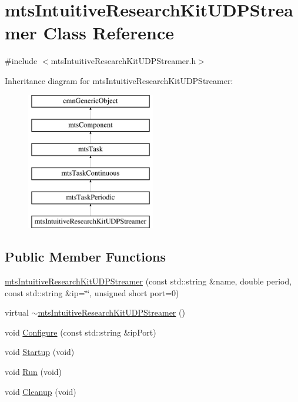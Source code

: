 \hypertarget{classmts_intuitive_research_kit_u_d_p_streamer}{}\section{mts\+Intuitive\+Research\+Kit\+U\+D\+P\+Streamer Class Reference}
\label{classmts_intuitive_research_kit_u_d_p_streamer}


{\ttfamily \#include $<$mts\+Intuitive\+Research\+Kit\+U\+D\+P\+Streamer.\+h$>$}

Inheritance diagram for mts\+Intuitive\+Research\+Kit\+U\+D\+P\+Streamer\+:\begin{figure}[H]
\begin{center}
\leavevmode
\includegraphics[height=6.000000cm]{dd/d92/classmts_intuitive_research_kit_u_d_p_streamer}
\end{center}
\end{figure}
\subsection*{Public Member Functions}
\begin{DoxyCompactItemize}
\item 
\hyperlink{classmts_intuitive_research_kit_u_d_p_streamer_a4d68f5b7d022ee7be40fb554e07718a5}{mts\+Intuitive\+Research\+Kit\+U\+D\+P\+Streamer} (const std\+::string \&name, double period, const std\+::string \&ip=\char`\"{}\char`\"{}, unsigned short port=0)
\item 
virtual \hyperlink{classmts_intuitive_research_kit_u_d_p_streamer_ac430ca9b4664fd999b539f48e6c4850b}{$\sim$mts\+Intuitive\+Research\+Kit\+U\+D\+P\+Streamer} ()
\item 
void \hyperlink{classmts_intuitive_research_kit_u_d_p_streamer_a6cdd3746c9fe6cf5c5dc4671a0c61131}{Configure} (const std\+::string \&ip\+Port)
\item 
void \hyperlink{classmts_intuitive_research_kit_u_d_p_streamer_a07a4cfbae0395d18a12e1bb8ee2c17e0}{Startup} (void)
\item 
void \hyperlink{classmts_intuitive_research_kit_u_d_p_streamer_a300965bcb1e0bc75e323037f31213815}{Run} (void)
\item 
void \hyperlink{classmts_intuitive_research_kit_u_d_p_streamer_a03d77047da2f0331309d7719811e76b0}{Cleanup} (void)
\end{DoxyCompactItemize}
